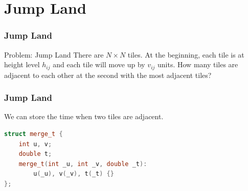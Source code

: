 \section{Jump Land}

\begin{frame}
\frametitle{Jump Land}
\begin{block}{Problem: Jump Land}
There are $N \times N$ tiles. At the beginning, each tile is at height level $h_{ij}$ and each tile will move up by $v_{ij}$ units. How many tiles are adjacent to each other at the second with the most adjacent tiles?
\end{block}

\begin{center}
\end{center}

\end{frame}

\begin{frame}[fragile]
\frametitle{Jump Land}
We can store the time when two tiles are adjacent.

\begin{lstlisting}[language=C++, basicstyle=\small]
struct merge_t {
    int u, v;
    double t;
    merge_t(int _u, int _v, double _t):
        u(_u), v(_v), t(_t) {}
};
\end{lstlisting}

\end{frame}

